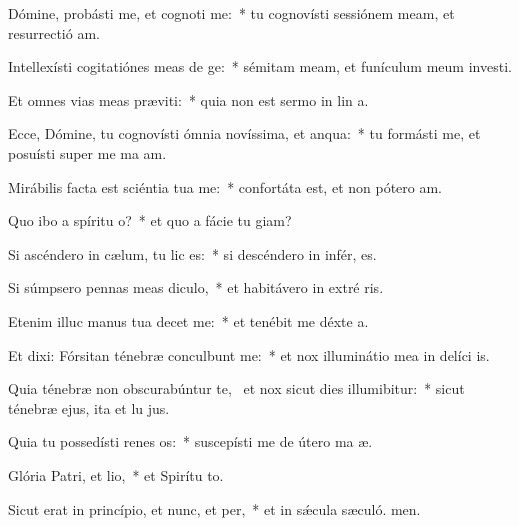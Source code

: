 \item Dómine, probásti me, et cognoti me:~* tu cognovísti sessiónem meam, et resurrectió am.
\item Intellexísti cogitatiónes meas de ge:~* sémitam meam, et funículum meum investi.
\item Et omnes vias meas præviti:~* quia non est sermo in lin a.
\item Ecce, Dómine, tu cognovísti ómnia novíssima, et anqua:~* tu formásti me, et posuísti super me ma am.
\item Mirábilis facta est sciéntia tua  me:~* confortáta est, et non pótero  am.
\item Quo ibo a spíritu o?~* et quo a fácie tu giam?
\item Si ascéndero in cælum, tu lic es:~* si descéndero in infér, es.
\item Si súmpsero pennas meas diculo,~* et habitávero in extré ris.
\item Etenim illuc manus tua decet me:~* et tenébit me déxte a.
\item Et dixi: Fórsitan ténebræ conculbunt me:~* et nox illuminátio mea in delíci is.
\item Quia ténebræ non obscurabúntur  te,~\pscross{} et nox sicut dies illumibitur:~* sicut ténebræ ejus, ita et lu jus.
\item Quia tu possedísti renes os:~* suscepísti me de útero ma æ.
\item Glória Patri, et lio,~* et Spirítu to.
\item Sicut erat in princípio, et nunc, et per,~* et in sǽcula sæculó. men.
